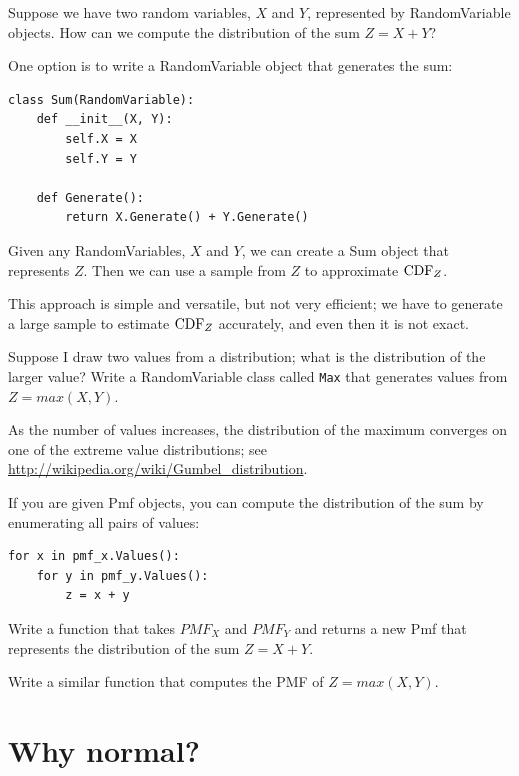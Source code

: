 \documentclass[12pt]{book}
\begin{document}
Suppose we have two random variables, $X$ and $Y$, represented
by RandomVariable objects.
How can we compute the distribution of the sum $Z = X + Y$?

One option is to write a RandomVariable object that generates
the sum:
%
\begin{verbatim}
class Sum(RandomVariable):
    def __init__(X, Y):
        self.X = X
        self.Y = Y

    def Generate():
        return X.Generate() + Y.Generate()
\end{verbatim}

Given any RandomVariables, $X$ and $Y$, we can create a Sum
object that represents $Z$.  Then we can use a sample from $Z$ to
approximate $\mathrm{CDF}_{Z}$.

This approach is simple and versatile, but not very efficient; we
have to generate a large sample to estimate $\mathrm{CDF}_{Z}$ accurately, and
even then it is not exact.


\begin{exercise}
Suppose I draw two values from a distribution; what is the distribution
of the larger value?  Write a RandomVariable class called {\tt Max}
that generates values from $Z = max(X, Y)$.

As the number of values increases, the distribution of the maximum
converges on one of the extreme value distributions; see
\url{http://wikipedia.org/wiki/Gumbel_distribution}.

\end{exercise}

\begin{exercise}
If you are given Pmf objects, you can compute the distribution of
the sum by enumerating all pairs of values:
%
\begin{verbatim}
for x in pmf_x.Values():
    for y in pmf_y.Values():
        z = x + y
\end{verbatim}

Write a function that takes $PMF_{X}$ and
$PMF_{Y}$ and returns a new Pmf that represents the distribution of
the sum $Z = X + Y$.

Write a similar function that computes the PMF of $Z = max(X, Y)$.

\end{exercise}



\section{Why normal?}
\label{why_normal}
\end{document}
